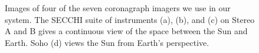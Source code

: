 \documentclass[journal]{vgtc}                %
\begin{document}
\begin{figure}
{}
\hfill{}
\hfill{}
\caption{Images of four of the seven coronagraph imagers we use in our system. The SECCHI suite of instruments (a), (b), and (c) on Stereo A and B gives a continuous view of the space between the Sun and Earth. Soho (d) views the Sun from Earth's perspective.}
\label{fig:coronagraph}
\end{figure}
\end{document}
